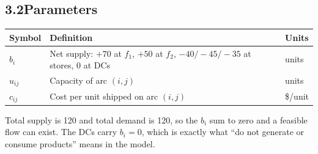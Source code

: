 \documentclass[11pt]{article}
\begin{document}
\subsection*{3.2\quad Parameters}

\begin{center}
\begin{tabular}{@{}lll@{}}
\toprule
Symbol & Definition & Units \\
\midrule
$b_i$ & Net supply: $+70$ at $f_1$, $+50$ at $f_2$,
        $-40/-45/-35$ at stores, 0 at DCs & units \\
$u_{ij}$ & Capacity of arc $(i,j)$ & units \\
$c_{ij}$ & Cost per unit shipped on arc $(i,j)$ & \$/unit \\
\bottomrule
\end{tabular}
\end{center}

Total supply is 120 and total demand is 120, so the $b_i$ sum to zero
and a feasible flow can exist. The DCs carry $b_i = 0$, which is exactly
what ``do not generate or consume products'' means in the model.
\end{document}
